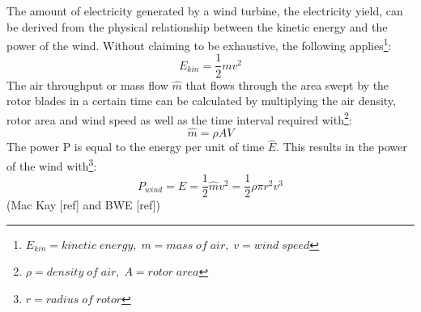 \documentclass[a4paper,11pt]{article}
\begin{document}
The amount of electricity generated by a wind turbine, the electricity yield, can be derived from the physical relationship between the kinetic energy and the power of the wind. Without claiming to be exhaustive, the following applies\footnote{\(E_{kin}= kinetic\; energy,\; m=mass\; of\; air,\; v= wind\;speed\)}:
\begin{equation}
E_{kin} = \frac{1}{2}mv^2
\end{equation}
The air throughput or mass flow \(\hat{m}\) that flows through the area swept by the rotor blades in a certain time can be calculated by multiplying the air density, rotor area and wind speed as well as the time interval required with\footnote{\(\rho= density\; of\; air,\; A= rotor\; area\)}:
\begin{equation}
\hat{m}=\rho A V
\end{equation}
The power P is equal to the energy per unit of time \(\hat{E}\). This results in the power of the wind with\footnote{\(r= radius\; of\; rotor\)}:
\begin{equation}
P_{wind}=\hat{E}=\frac{1}{2}\hat{m}v^2=\frac{1}{2} \rho \pi r^2 v^3
\end{equation}
(Mac Kay {[}ref{]} and BWE {[}ref{]})
\end{document}
